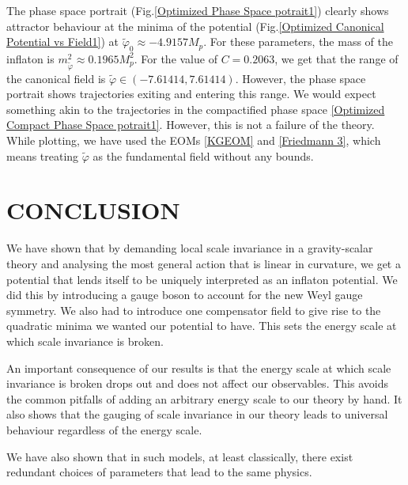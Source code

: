 \documentclass[aps,prd,reprint,preprintnumbers,showpacs,floatfix,nofootinbib,superscript address]{revtex4-2}
\begin{document}
The phase space portrait (Fig.\ref{Optimized Phase Space potrait1}) clearly shows attractor behaviour at the minima of the potential (Fig.\ref{Optimized Canonical Potential vs Field1}) at $\tilde{\varphi}_0 \approx -4.9157 M_p$. For these parameters, the mass of the inflaton is $m_{\tilde{\varphi}}^2 \approx  0.1965 M_p^2$. For the value of $C = 0.2063$, we get that the range of the canonical field is $\tilde{\varphi} \in (-7.61414,7.61414)$. However, the phase space portrait shows trajectories exiting and entering this range. We would expect something akin to the trajectories in the compactified phase space \ref{Optimized Compact Phase Space potrait1}. However, this is not a failure of the theory. While plotting, we have used the EOMs \ref{KGEOM} and \ref{Friedmann 3}, which means treating $\tilde{\varphi}$ as the fundamental field without any bounds.


\section{CONCLUSION}
We have shown that by demanding local scale invariance in a gravity-scalar theory and analysing the most general action that is linear in curvature, we get a potential that lends itself to be uniquely interpreted as an inflaton potential. We did this by introducing a gauge boson to account for the new Weyl gauge symmetry. We also had to introduce one compensator field to give rise to the quadratic minima we wanted our potential to have. This sets the energy scale at which scale invariance is broken.

An important consequence of our results is that the energy scale at which scale invariance is broken drops out and does not affect our observables. This avoids the common pitfalls of adding an arbitrary energy scale to our theory by hand. It also shows that the gauging of scale invariance in our theory leads to universal behaviour regardless of the energy scale.

We have also shown that in such models, at least classically, there exist redundant choices of parameters that lead to the same physics. 


\newpage
\,\,
\newpage

\appendix
\end{document}
